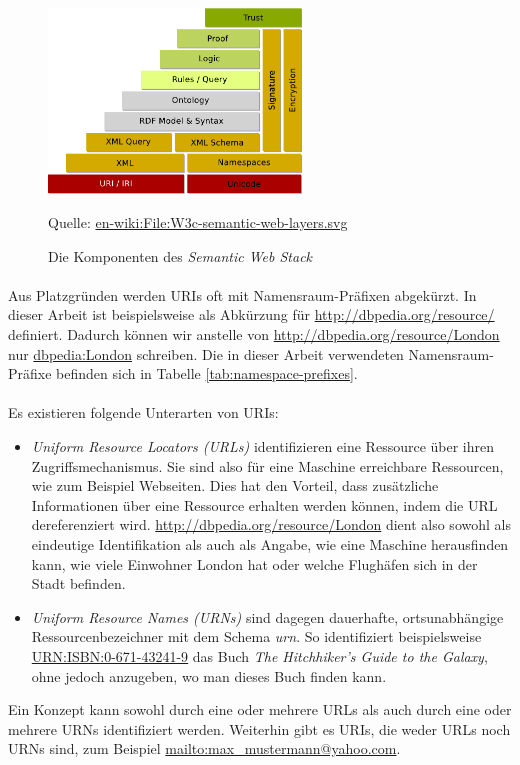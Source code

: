 \begin{figure}[htb]
    \begin{threeparttable}
    \centering  
    \includegraphics[width=0.6\textwidth]{img/pdf/w3c-semantic-web-layers.pdf}
      \begin{tablenotes}\footnotesize
      \item [~] Quelle: \url{en-wiki:File:W3c-semantic-web-layers.svg}
      \end{tablenotes}   
    \end{threeparttable}
    \caption[]{Die Komponenten des \emph{Semantic Web Stack}}
  \end{figure} 


\paragraph{}
Aus Platzgründen werden URIs oft mit Namensraum-Präfixen abgekürzt.
In dieser Arbeit ist beispielsweise  als Abkürzung für \url{http://dbpedia.org/resource/} definiert.
Dadurch können wir anstelle von \url{http://dbpedia.org/resource/London} nur \url{dbpedia:London} schreiben.
Die in dieser Arbeit verwendeten Namensraum-Präfixe befinden sich in Tabelle \ref{tab:namespace-prefixes}.
\paragraph{}
Es existieren folgende Unterarten von URIs:
\begin{itemize}
 \item \emph{Uniform Resource Locators (URLs)} identifizieren eine Ressource über ihren Zugriffsmechanismus. Sie sind also für eine Maschine erreichbare Ressourcen, wie zum Beispiel Webseiten.
Dies hat den Vorteil, dass zusätzliche Informationen über eine Ressource erhalten werden können, indem die URL dereferenziert wird.
\url{http://dbpedia.org/resource/London} dient also sowohl als eindeutige Identifikation als auch als Angabe, 
wie eine Maschine herausfinden kann, wie viele Einwohner London hat oder welche Flughäfen sich in der Stadt befinden.
 \item \emph{Uniform Resource Names (URNs)} sind dagegen dauerhafte, ortsunabhängige Ressourcenbezeichner mit dem Schema \emph{urn}. So identifiziert beispielsweise \url{URN:ISBN:0-671-43241-9} das Buch
\emph{The Hitchhiker's Guide to the Galaxy}, ohne jedoch anzugeben, wo man dieses Buch finden kann.
\end{itemize}
Ein Konzept kann sowohl durch eine oder mehrere URLs als auch durch eine oder mehrere URNs identifiziert werden.
Weiterhin gibt es URIs, die weder URLs noch URNs sind, zum Beispiel \url{mailto:max_mustermann@yahoo.com}.

